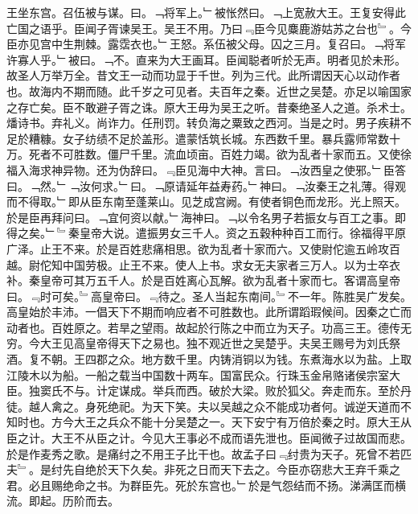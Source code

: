 \documentclass{zhvt-classic}
\begin{document}
\hspace*{2em}王坐东宫。召伍被与谋。曰。﹁将军上。﹂被怅然曰。﹁上宽赦大王。王复安得此亡国之语乎。臣闻子胥谏吴王。吴王不用。乃曰﹃臣今见麋鹿游姑苏之台也﹄。今臣亦见宫中生荆棘。露霑衣也。﹂王怒。系伍被父母。囚之三月。复召曰。﹁将军许寡人乎。﹂被曰。﹁不。直来为大王画耳。臣闻聪者听於无声。明者见於未形。故圣人万举万全。昔文王一动而功显于千世。列为三代。此所谓因天心以动作者也。故海内不期而随。此千岁之可见者。夫百年之秦。近世之吴楚。亦足以喻国家之存亡矣。臣不敢避子胥之诛。原大王毋为吴王之听。昔秦绝圣人之道。杀术士。燔诗书。弃礼义。尚诈力。任刑罚。转负海之粟致之西河。当是之时。男子疾耕不足於糟糠。女子纺绩不足於盖形。遣蒙恬筑长城。东西数千里。暴兵露师常数十万。死者不可胜数。僵尸千里。流血顷亩。百姓力竭。欲为乱者十家而五。又使徐福入海求神异物。还为伪辞曰。﹃臣见海中大神。言曰。﹁汝西皇之使邪。﹂臣答曰。﹁然。﹂﹁汝何求。﹂曰。﹁原请延年益寿药。﹂神曰。﹁汝秦王之礼薄。得观而不得取。﹂即从臣东南至蓬莱山。见芝成宫阙。有使者铜色而龙形。光上照天。於是臣再拜问曰。﹁宜何资以献。﹂海神曰。﹁以令名男子若振女与百工之事。即得之矣。﹂﹄秦皇帝大说。遣振男女三千人。资之五穀种种百工而行。徐福得平原广泽。止王不来。於是百姓悲痛相思。欲为乱者十家而六。又使尉佗逾五岭攻百越。尉佗知中国劳极。止王不来。使人上书。求女无夫家者三万人。以为士卒衣补。秦皇帝可其万五千人。於是百姓离心瓦解。欲为乱者十家而七。客谓高皇帝曰。﹃时可矣。﹄高皇帝曰。﹃待之。圣人当起东南间。﹄不一年。陈胜吴广发矣。高皇始於丰沛。一倡天下不期而响应者不可胜数也。此所谓蹈瑕候间。因秦之亡而动者也。百姓原之。若旱之望雨。故起於行陈之中而立为天子。功高三王。德传无穷。今大王见高皇帝得天下之易也。独不观近世之吴楚乎。夫吴王赐号为刘氏祭酒。复不朝。王四郡之众。地方数千里。内铸消铜以为钱。东煮海水以为盐。上取江陵木以为船。一船之载当中国数十两车。国富民众。行珠玉金帛赂诸侯宗室大臣。独窦氏不与。计定谋成。举兵而西。破於大梁。败於狐父。奔走而东。至於丹徒。越人禽之。身死绝祀。为天下笑。夫以吴越之众不能成功者何。诚逆天道而不知时也。方今大王之兵众不能十分吴楚之一。天下安宁有万倍於秦之时。原大王从臣之计。大王不从臣之计。今见大王事必不成而语先泄也。臣闻微子过故国而悲。於是作麦秀之歌。是痛纣之不用王子比干也。故孟子曰﹃纣贵为天子。死曾不若匹夫﹄。是纣先自绝於天下久矣。非死之日而天下去之。今臣亦窃悲大王弃千乘之君。必且赐绝命之书。为群臣先。死於东宫也。﹂於是气怨结而不扬。涕满匡而横流。即起。历阶而去。\\
\end{document}
